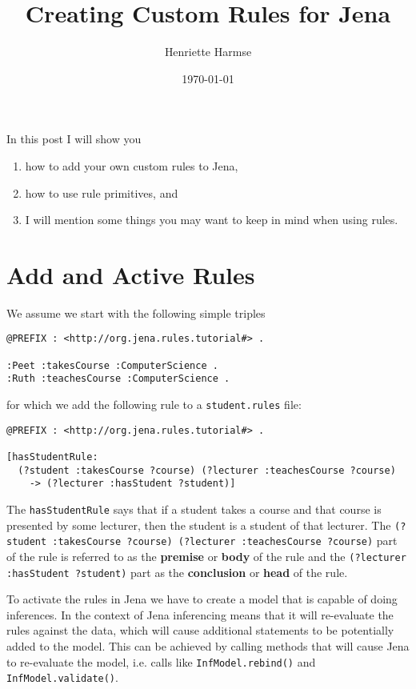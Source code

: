 \documentclass{amsart}
\title{Creating Custom Rules for Jena}
\author{Henriette Harmse}
\date{\today}
\begin{document}
  \maketitle
  
  In this post I will show you
  \begin{enumerate}
   \item how to add your own custom rules to Jena,
   \item how to use rule primitives, and
   \item I will mention some things you may want to keep in mind when using rules. 
  \end{enumerate}

  \section{Add and Active Rules}
  We assume we start with the following simple triples

\begin{small}
\begin{verbatim}
@PREFIX : <http://org.jena.rules.tutorial#> .
 
:Peet :takesCourse :ComputerScience .
:Ruth :teachesCourse :ComputerScience . 
\end{verbatim}
\end{small}

  for which we add the following rule to a \texttt{student.rules} file:

\begin{small}
\begin{verbatim}
@PREFIX : <http://org.jena.rules.tutorial#> .

[hasStudentRule: 
  (?student :takesCourse ?course) (?lecturer :teachesCourse ?course) 
    -> (?lecturer :hasStudent ?student)]  
\end{verbatim}
\end{small}

The \texttt{hasStudentRule} says that if a student takes a course and that course is presented by some lecturer, then the student is a student of that lecturer. The
\texttt{(?student :takesCourse ?course) (?lecturer :teachesCourse ?course)}
part of the rule is referred to as the \textbf{premise} or \textbf{body} of the rule and the
\texttt{(?lecturer :hasStudent ?student)} part as the \textbf{conclusion} or \textbf{head} of the rule.

To activate the rules in Jena we have to create a model that is capable of doing inferences. In the context of Jena inferencing means that it will re-evaluate the rules against the data, which will cause additional statements to be potentially added to the model. This can be achieved by calling methods that will cause Jena to re-evaluate the model, i.e. calls like \texttt{InfModel.rebind()} and \texttt{InfModel.validate()}.
\end{document}
